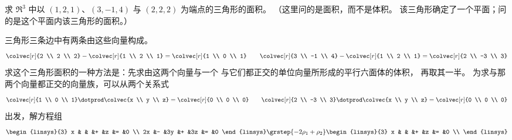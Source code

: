\begin{exercises}
    求 \( \Re^3 \) 中以 \( (1,2,1) \)、\( (3,-1,4) \) 与 \( (2,2,2) \)
    为端点的三角形的面积。
    （这里问的是面积，而不是体积。
    该三角形确定了一个平面；问的是这个平面内该三角形的面积。）
    \begin{answer}
      三角形三条边中有两条由这些向量构成。
      \begin{equation*}
        \colvec[r]{2 \\ 2 \\ 2}-\colvec[r]{1 \\ 2 \\ 1}=\colvec[r]{1 \\ 0 \\ 1}
        \qquad
        \colvec[r]{3 \\ -1 \\ 4}-\colvec[r]{1 \\ 2 \\ 1}=\colvec[r]{2 \\ -3 \\ 3}
      \end{equation*}
      求这个三角形面积的一种方法是：先求由这两个向量与一个
      与它们都正交的单位向量所形成的平行六面体的体积，
      再取其一半。
      为求与那两个向量都正交的向量族，可以从两个关系式
      \begin{equation*}
        \colvec[r]{1 \\ 0 \\ 1}
        \dotprod\colvec{x \\ y \\ z}
        =\colvec[r]{0 \\ 0 \\ 0}
        \qquad
        \colvec[r]{2 \\ -3 \\ 3}
        \dotprod\colvec{x \\ y \\ z}
        =\colvec[r]{0 \\ 0 \\ 0}
      \end{equation*}
      出发，解方程组
      \begin{equation*}
        \begin{linsys}{3}
          x  &   &   &+  &z  &=  &0  \\
         2x  &-  &3y &+  &3z &=  &0  
        \end{linsys}
        \grstep{-2\rho_1+\rho_2}
        \begin{linsys}{3}
          x  &   &   &+  &z  &=  &0  \\

\end{linsys}
\end{equation*}
\end{answer}
\end{exercises}
